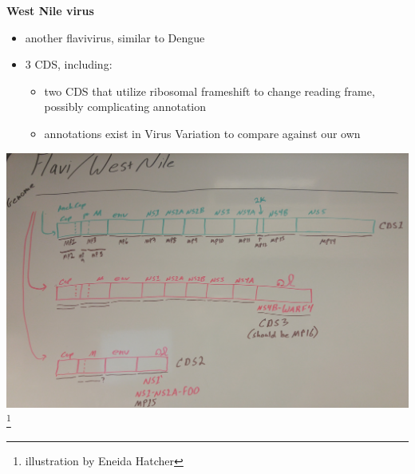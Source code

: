 \documentclass[landscape]{slides}
\begin{document}
\begin{slide}
\begin{center}
\textbf{West Nile virus}

\small  
\begin{itemize}
\item another flavivirus, similar to Dengue
\item 3 CDS, including:
\begin{itemize}
  \item two CDS that utilize ribosomal frameshift to change reading
    frame, \\ possibly complicating annotation
\item annotations exist in Virus Variation to compare against our own
\end{itemize}
\end{itemize}

\includegraphics[width=8in]{figs/flavi-wnv-eneida}\footnote{illustration
  by Eneida Hatcher}

\end{center}
\vfill

\end{slide}
\end{document}
